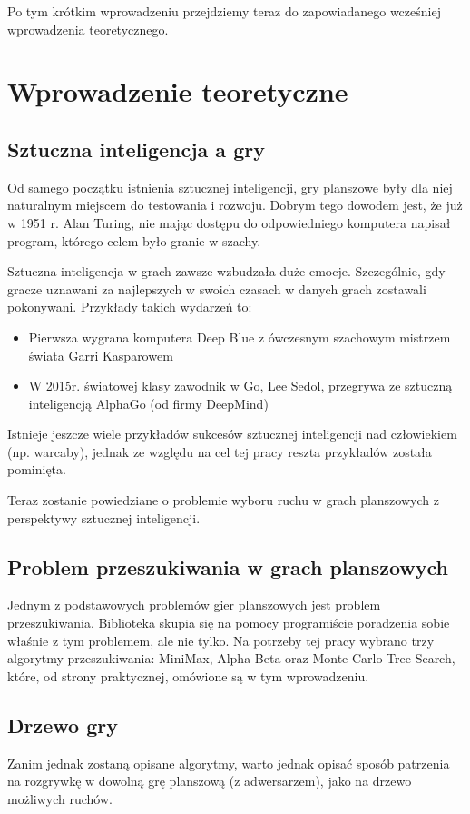 \documentclass[polish,shortabstract,inz]{iithesis}
\begin{document}
Po tym krótkim wprowadzeniu przejdziemy teraz do zapowiadanego wcześniej wprowadzenia teoretycznego.


\chapter{Wprowadzenie teoretyczne}
\section{Sztuczna inteligencja a gry}
Od samego początku istnienia sztucznej inteligencji, gry planszowe były dla niej naturalnym miejscem do testowania i rozwoju.
Dobrym tego dowodem jest, że już w 1951 r. Alan Turing, nie mając dostępu do odpowiedniego komputera napisał program, którego celem było granie w szachy.

Sztuczna inteligencja w grach zawsze wzbudzała duże emocje.
Szczególnie, gdy gracze uznawani za najlepszych w swoich czasach w danych grach zostawali pokonywani.
Przykłady takich wydarzeń to:
\begin{itemize}
    \item Pierwsza wygrana komputera Deep Blue\cite{deepblue} z ówczesnym szachowym mistrzem świata Garri Kasparowem
    \item W 2015r. światowej klasy zawodnik w Go, Lee Sedol, przegrywa ze sztuczną inteligencją AlphaGo\cite{alphago} (od firmy DeepMind)
\end{itemize}

Istnieje jeszcze wiele przykładów sukcesów sztucznej inteligencji nad człowiekiem (np. warcaby), jednak ze względu na cel tej pracy reszta przykładów została pominięta.

Teraz zostanie powiedziane o problemie wyboru ruchu w grach planszowych z perspektywy sztucznej inteligencji.

\section{Problem przeszukiwania w grach planszowych}
Jednym z podstawowych problemów gier planszowych jest problem przeszukiwania.
Biblioteka skupia się na pomocy programiście poradzenia sobie właśnie z tym problemem, ale nie tylko.
Na potrzeby tej pracy wybrano trzy algorytmy przeszukiwania: MiniMax, Alpha-Beta oraz Monte Carlo Tree Search, które, od strony praktycznej, omówione są w tym wprowadzeniu.

\section{Drzewo gry}
Zanim jednak zostaną opisane algorytmy, warto jednak opisać sposób patrzenia na rozgrywkę w dowolną grę planszową (z adwersarzem), jako na drzewo możliwych ruchów.
\end{document}
